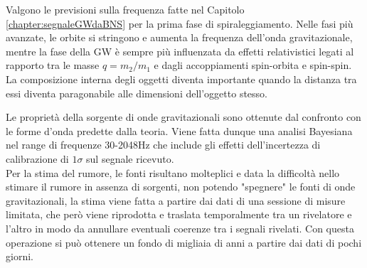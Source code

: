 Valgono le previsioni sulla frequenza fatte nel Capitolo \ref{chapter:segnaleGWdaBNS} per la prima fase di spiraleggiamento. Nelle fasi più avanzate, le orbite si stringono e aumenta la frequenza dell'onda gravitazionale, mentre la fase della GW è sempre più influenzata da effetti relativistici legati al rapporto tra le masse $q = m_2/m_1$ e dagli accoppiamenti spin-orbita e spin-spin. La composizione interna degli oggetti diventa importante quando la distanza tra essi diventa paragonabile alle dimensioni dell'oggetto stesso. 

Le proprietà della sorgente di onde gravitazionali sono ottenute dal confronto con le forme d'onda predette dalla teoria. Viene fatta dunque una analisi Bayesiana nel range di frequenze 30-2048Hz che include gli effetti dell'incertezza di calibrazione di $1\sigma$ sul segnale ricevuto.\\Per la stima del rumore, le fonti risultano molteplici e data la difficoltà nello stimare il rumore in assenza di sorgenti, non potendo "spegnere" le fonti di onde gravitazionali, la stima viene fatta a partire dai dati di una sessione di misure limitata, che però viene riprodotta e traslata temporalmente tra un rivelatore e l'altro in modo da annullare eventuali coerenze tra i segnali rivelati. Con questa operazione si può ottenere un fondo di migliaia di anni a partire dai dati di pochi giorni.

